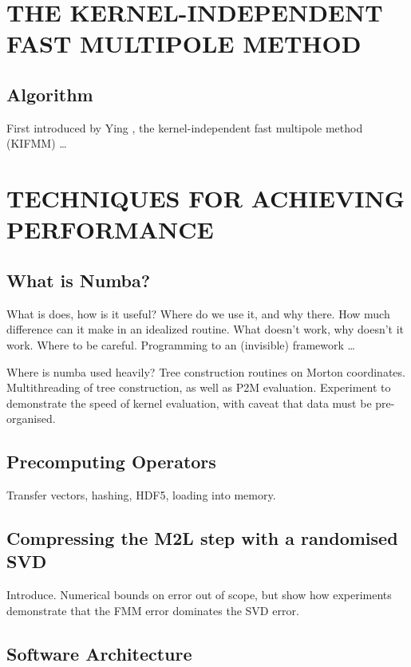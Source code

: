 \documentclass{IEEEcsmag}
\begin{document}
\section{THE KERNEL-INDEPENDENT FAST MULTIPOLE METHOD}

\subsection{Algorithm}

First introduced by Ying \cite{Ying2004}, the kernel-independent fast multipole method (KIFMM) \dots

\section{TECHNIQUES FOR ACHIEVING PERFORMANCE}

\subsection{What is Numba?}

What is does, how is it useful? Where do we use it, and why there. How much difference can it make in an idealized routine. What doesn't work, why doesn't it work. Where to be careful. Programming to an (invisible) framework \dots

Where is numba used heavily? Tree construction routines on Morton coordinates. Multithreading of tree construction, as well as P2M evaluation. Experiment to demonstrate the speed of kernel evaluation, with caveat that data must be pre-organised.

\subsection{Precomputing Operators}

Transfer vectors, hashing, HDF5, loading into memory.

\subsection{Compressing the M2L step with a randomised SVD}

Introduce. Numerical bounds on error out of scope, but show how experiments demonstrate that the FMM error dominates the SVD error.

\subsection{Software Architecture}
\end{document}

